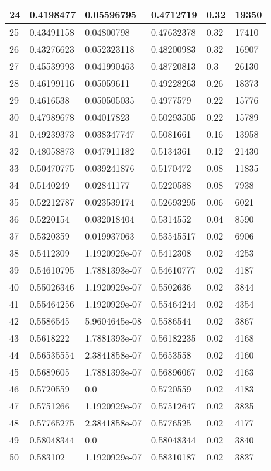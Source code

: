\begin{longtable}{|l|l|l|l|l|l|}
24 & 0.4198477 & 0.05596795 & 0.4712719 & 0.32 & 19350 \\ \hline 
25 & 0.43491158 & 0.04800798 & 0.47632378 & 0.32 & 17410 \\ \hline 
26 & 0.43276623 & 0.052323118 & 0.48200983 & 0.32 & 16907 \\ \hline 
27 & 0.45539993 & 0.041990463 & 0.48720813 & 0.3 & 26130 \\ \hline 
28 & 0.46199116 & 0.05059611 & 0.49228263 & 0.26 & 18373 \\ \hline 
29 & 0.4616538 & 0.050505035 & 0.4977579 & 0.22 & 15776 \\ \hline 
30 & 0.47989678 & 0.04017823 & 0.50293505 & 0.22 & 15789 \\ \hline 
31 & 0.49239373 & 0.038347747 & 0.5081661 & 0.16 & 13958 \\ \hline 
32 & 0.48058873 & 0.047911182 & 0.5134361 & 0.12 & 21430 \\ \hline 
33 & 0.50470775 & 0.039241876 & 0.5170472 & 0.08 & 11835 \\ \hline 
34 & 0.5140249 & 0.02841177 & 0.5220588 & 0.08 & 7938 \\ \hline 
35 & 0.52212787 & 0.023539174 & 0.52693295 & 0.06 & 6021 \\ \hline 
36 & 0.5220154 & 0.032018404 & 0.5314552 & 0.04 & 8590 \\ \hline 
37 & 0.5320359 & 0.019937063 & 0.53545517 & 0.02 & 6906 \\ \hline 
38 & 0.5412309 & 1.1920929e-07 & 0.5412308 & 0.02 & 4253 \\ \hline 
39 & 0.54610795 & 1.7881393e-07 & 0.54610777 & 0.02 & 4187 \\ \hline 
40 & 0.55026346 & 1.1920929e-07 & 0.5502636 & 0.02 & 3844 \\ \hline 
41 & 0.55464256 & 1.1920929e-07 & 0.55464244 & 0.02 & 4354 \\ \hline 
42 & 0.5586545 & 5.9604645e-08 & 0.5586544 & 0.02 & 3867 \\ \hline 
43 & 0.5618222 & 1.7881393e-07 & 0.56182235 & 0.02 & 4168 \\ \hline 
44 & 0.56535554 & 2.3841858e-07 & 0.5653558 & 0.02 & 4160 \\ \hline 
45 & 0.5689605 & 1.7881393e-07 & 0.56896067 & 0.02 & 4163 \\ \hline 
46 & 0.5720559 & 0.0 & 0.5720559 & 0.02 & 4183 \\ \hline 
47 & 0.5751266 & 1.1920929e-07 & 0.57512647 & 0.02 & 3835 \\ \hline 
48 & 0.57765275 & 2.3841858e-07 & 0.5776525 & 0.02 & 4177 \\ \hline 
49 & 0.58048344 & 0.0 & 0.58048344 & 0.02 & 3840 \\ \hline 
50 & 0.583102 & 1.1920929e-07 & 0.58310187 & 0.02 & 3837 \\ \hline 
\end{longtable}
